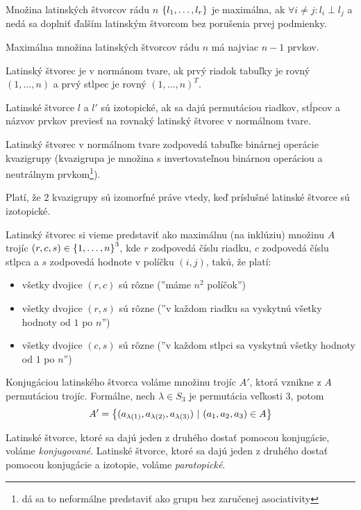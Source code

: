 \begin{definition}
Množina latinských štvorcov rádu $n$ $\left\{l_1, \ldots, l_r\right\}$ je maximálna, ak $\forall i \neq j: l_i \perp l_j$ a 
nedá sa doplniť ďalším latinským štvorcom bez porušenia prvej podmienky. 
\end{definition}

\begin{theorem}
Maximálna množina latinských štvorcov rádu $n$ má najviac $n-1$ prvkov.
\end{theorem}

\begin{definition}
Latinský štvorec je v normánom tvare, ak prvý riadok tabuľky je rovný $(1, \ldots, n)$ a prvý stlpec je rovný $(1, \ldots, n)^T$.
\end{definition}

\begin{definition}
Latinské štvorce $l$ a $l'$ sú izotopické, ak sa dajú permutáciou riadkov, stĺpcov a názvov prvkov previesť na rovnaký latinský štvorec v normálnom tvare.
\end{definition}

\begin{remark}
Latinský štvorec v normálnom tvare zodpovedá tabuľke binárnej operácie kvazigrupy 
(kvazigrupa je množina s invertovateľnou binárnou operáciou a neutrálnym prvkom\footnote{dá sa to neformálne predstaviť ako grupu bez zaručenej asociativity}).

Platí, že 2 kvazigrupy sú izomorfné práve vtedy, keď príslušné latinské štvorce sú izotopické.
\end{remark}

\begin{definition}
Latinský štvorec si vieme predstaviť ako maximálnu (na inklúziu) množinu $A$ trojíc $(r,c,s) \in \left\{1, \ldots, n\right\}^3$, 
kde $r$ zodpovedá číslu riadku, $c$ zodpovedá číslu stlpca a $s$ zodpovedá hodnote v políčku $(i, j)$, 
takú, že platí:
\begin{itemize}
    \item všetky dvojice $(r, c)$ sú rôzne (''máme $n^2$ políčok'')
    \item všetky dvojice $(r, s)$ sú rôzne (''v každom riadku sa vyskytnú všetky hodnoty od $1$ po $n$'')
    \item všetky dvojice $(c, s)$ sú rôzne (''v každom stlpci sa vyskytnú všetky hodnoty od $1$ po $n$'')
\end{itemize}  

Konjugáciou latinského štvorca voláme množinu trojíc $A'$, ktorá vznikne z $A$ permutáciou trojíc. Formálne,
nech $\lambda \in S_3$ je permutácia veľkosti $3$, potom $$A' = \left\{ (a_{\lambda(1)}, a_{\lambda(2)}, a_{\lambda(3)} ) ~|~ (a_1, a_2, a_3) \in A\right\}$$

Latinské štvorce, ktoré sa dajú jeden z druhého dostať pomocou konjugácie, voláme \emph{konjugované}.
Latinské štvorce, ktoré sa dajú jeden z druhého dostať pomocou konjugácie a izotopie, voláme \emph{paratopické}.

\end{definition}


